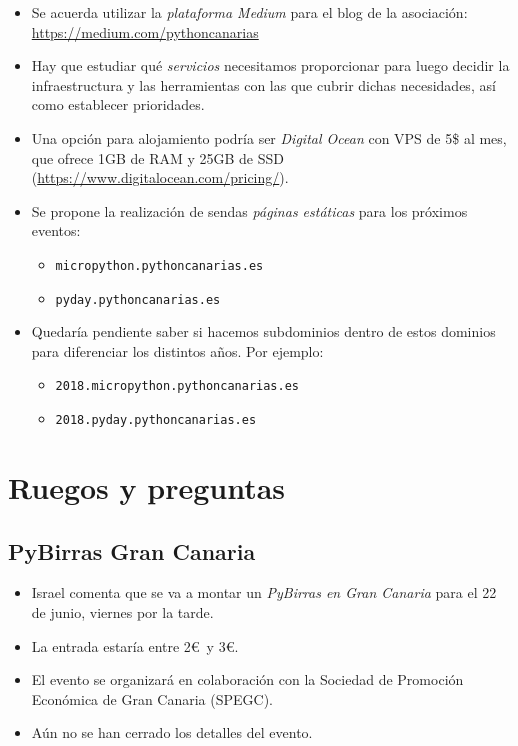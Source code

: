 \documentclass[a4paper, 12pt]{article}
\begin{document}
\begin{itemize}
    \item Se acuerda utilizar la \textit{plataforma Medium} para el blog de la asociación: \url{https://medium.com/pythoncanarias}
    \item Hay que estudiar qué \textit{servicios} necesitamos proporcionar para luego decidir la infraestructura y las herramientas con las que cubrir dichas necesidades, así como establecer prioridades.
    \item Una opción para alojamiento podría ser \textit{Digital Ocean} con VPS de 5\$ al mes, que ofrece 1GB de RAM y 25GB de SSD (\url{https://www.digitalocean.com/pricing/}).
    \item Se propone la realización de sendas \textit{páginas estáticas} para los próximos eventos:
    \begin{itemize}
        \item \texttt{micropython.pythoncanarias.es}
        \item \texttt{pyday.pythoncanarias.es}
    \end{itemize}
    \item Quedaría pendiente saber si hacemos subdominios dentro de estos dominios para diferenciar los distintos años. Por ejemplo:
    \begin{itemize}
        \item \texttt{2018.micropython.pythoncanarias.es}
        \item \texttt{2018.pyday.pythoncanarias.es}
    \end{itemize}
\end{itemize}

\section{Ruegos y preguntas}

\subsection*{PyBirras Gran Canaria}

\begin{itemize}
    \item Israel comenta que se va a montar un \textit{PyBirras en Gran Canaria} para el 22 de junio, viernes por la tarde.
    \item La entrada estaría entre 2\euro\ y 3\euro.
    \item El evento se organizará en colaboración con la Sociedad de Promoción Económica de Gran Canaria (SPEGC).
    \item Aún no se han cerrado los detalles del evento.
\end{itemize}
\end{document}
